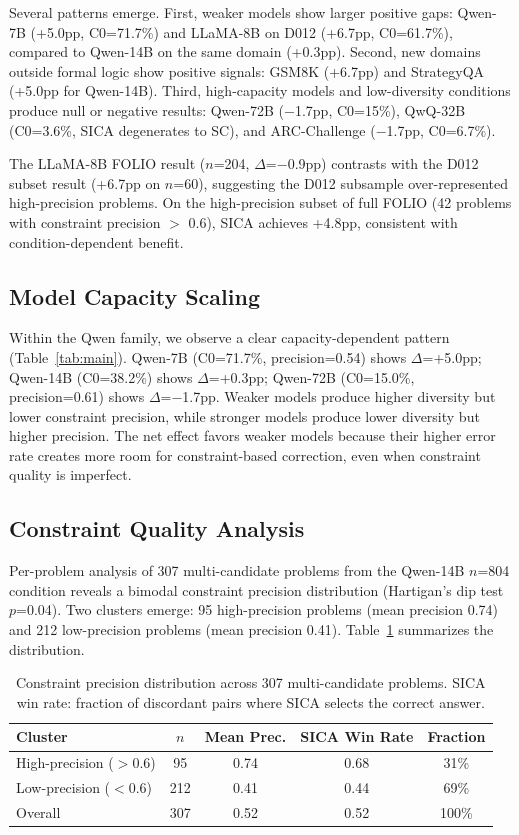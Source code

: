 \documentclass[11pt,a4paper]{article}
\begin{document}
Several patterns emerge. First, weaker models show larger positive gaps: Qwen-7B (+5.0pp, C0=71.7\%) and LLaMA-8B on D012 (+6.7pp, C0=61.7\%), compared to Qwen-14B on the same domain (+0.3pp). Second, new domains outside formal logic show positive signals: GSM8K (+6.7pp) and StrategyQA (+5.0pp for Qwen-14B). Third, high-capacity models and low-diversity conditions produce null or negative results: Qwen-72B ($-$1.7pp, C0=15\%), QwQ-32B (C0=3.6\%, SICA degenerates to SC), and ARC-Challenge ($-$1.7pp, C0=6.7\%).

The LLaMA-8B FOLIO result ($n$=204, $\Delta$=$-$0.9pp) contrasts with the D012 subset result (+6.7pp on $n$=60), suggesting the D012 subsample over-represented high-precision problems. On the high-precision subset of full FOLIO (42 problems with constraint precision $>$ 0.6), SICA achieves +4.8pp, consistent with condition-dependent benefit.

\subsection{Model Capacity Scaling}

Within the Qwen family, we observe a clear capacity-dependent pattern (Table~\ref{tab:main}). Qwen-7B (C0=71.7\%, precision=0.54) shows $\Delta$=+5.0pp; Qwen-14B (C0=38.2\%) shows $\Delta$=+0.3pp; Qwen-72B (C0=15.0\%, precision=0.61) shows $\Delta$=$-$1.7pp. Weaker models produce higher diversity but lower constraint precision, while stronger models produce lower diversity but higher precision. The net effect favors weaker models because their higher error rate creates more room for constraint-based correction, even when constraint quality is imperfect.

\subsection{Constraint Quality Analysis}
\label{sec:precision}

Per-problem analysis of 307 multi-candidate problems from the Qwen-14B $n$=804 condition reveals a bimodal constraint precision distribution (Hartigan's dip test $p$=0.04). Two clusters emerge: 95 high-precision problems (mean precision 0.74) and 212 low-precision problems (mean precision 0.41). Table~\ref{tab:precision} summarizes the distribution.

\begin{table}[t]
\centering
\caption{Constraint precision distribution across 307 multi-candidate problems. SICA win rate: fraction of discordant pairs where SICA selects the correct answer.}
\label{tab:precision}
\small
\begin{tabular}{lcccc}
\toprule
\textbf{Cluster} & \textbf{$n$} & \textbf{Mean Prec.} & \textbf{SICA Win Rate} & \textbf{Fraction} \\
\midrule
High-precision ($>$0.6) & 95 & 0.74 & 0.68 & 31\% \\
Low-precision ($<$0.6) & 212 & 0.41 & 0.44 & 69\% \\
\midrule
Overall & 307 & 0.52 & 0.52 & 100\% \\
\bottomrule
\end{tabular}
\end{table}
\end{document}

